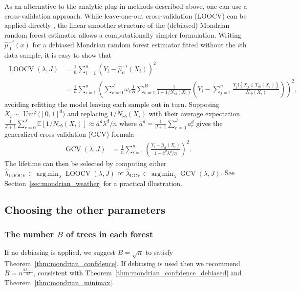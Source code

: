 \documentclass[11pt,lof]{puthesis}
\newcommand{\E}{\ensuremath{\mathbb{E}}}
\newcommand{\I}{\ensuremath{\mathbb{I}}}
\newcommand{\rd}{\ensuremath{\mathrm{d}}}
\DeclareMathOperator{\LOOCV}{LOOCV}
\DeclareMathOperator{\GCV}{GCV}
\DeclareMathOperator{\Unif}{Unif}
\DeclareMathOperator*{\argmin}{arg\,min}
\theoremstyle{break}
\theoremstyle{proof}
\begin{document}
As an alternative to the analytic plug-in methods described above, one can use
a cross-validation approach. While leave-one-out cross-validation (LOOCV) can
be applied directly \citep{fan2020statistical},
the linear smoother structure of the (debiased) Mondrian
random forest estimator allows a computationally simpler formulation. Writing
$\hat\mu_\rd^{-i}(x)$ for a debiased Mondrian random forest estimator fitted
without the $i$th data sample, it is easy to show that
%
\begin{align*}
\LOOCV(\lambda, J)
&=
\frac{1}{n}
\sum_{i=1}^{n}
\left( Y_i - \hat\mu_\rd^{-i}(X_i) \right)^2 \\
&=
\frac{1}{n}
\sum_{i=1}^{n}
\left(
\sum_{r=0}^{J}
\omega_r
\frac{1}{B}
\sum_{b=1}^{B}
\frac{1}{1 - 1/N_{r b}(X_i)}
\left( Y_i -
\sum_{j=1}^{n}
\frac{ Y_j \I \left\{ X_j \in T_{r b}(X_i) \right\}}
{N_{r b}(X_i)}
\right)
\right)^{2},
\end{align*}
%
avoiding refitting the model leaving each sample out in turn.
Supposing $X_i \sim \Unif\big([0,1]^d\big)$ and
replacing $1/N_{r b}(X_i)$ with their average expectation
$ \frac{1}{J+1} \sum_{r=0}^{J} \E \left[ 1/N_{r b}(X_i) \right]
\approx \bar a^d \lambda^d / n$
where $\bar a^d = \frac{1}{J+1} \sum_{r=0}^{J} a_r^d$
gives the generalized cross-validation (GCV) formula
%
\begin{align}
\label{eq:mondrian_gcv}
\GCV(\lambda, J)
&=
\frac{1}{n}
\sum_{i=1}^{n}
\left(
\frac{Y_i - \hat\mu_\rd(X_i)}
{1 - \bar a^d \lambda^d / n}
\right)^2.
\end{align}
%
The lifetime can then be selected by computing
either $\hat\lambda_{\LOOCV} \in \argmin_\lambda \LOOCV(\lambda, J)$
or $\hat\lambda_{\GCV} \in \argmin_\lambda \GCV(\lambda, J)$.
See Section~\ref{sec:mondrian_weather} for a practical illustration.

\subsection{Choosing the other parameters}

\subsubsection*{The number \texorpdfstring{$B$}{B} of trees in each forest}%

If no debiasing is applied, we suggest
$B = \sqrt{n}$ to satisfy
Theorem~\ref{thm:mondrian_confidence}.
If debiasing is used then we recommend
$B = n^{\frac{2J-1}{2J}}$, consistent with
Theorem~\ref{thm:mondrian_confidence_debiased}
and Theorem~\ref{thm:mondrian_minimax}.
\end{document}
